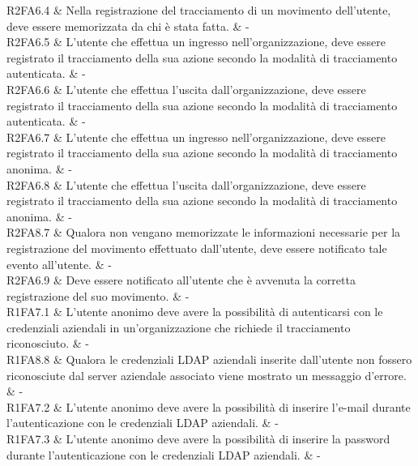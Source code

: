 R2FA6.4 & Nella registrazione del tracciamento di un movimento dell’utente, deve essere memorizzata da chi è stata fatta.  & - \\

R2FA6.5 & L’utente che effettua un ingresso nell’organizzazione, deve essere registrato il tracciamento della sua azione secondo la modalità di tracciamento autenticata.  & - \\

R2FA6.6 & L’utente che effettua l’uscita dall’organizzazione, deve essere registrato il tracciamento della sua azione secondo la modalità di tracciamento autenticata.  & - \\

R2FA6.7 & L’utente che effettua un ingresso nell’organizzazione, deve essere registrato il tracciamento della sua azione secondo la modalità di tracciamento anonima.  & - \\

R2FA6.8 & L’utente che effettua l’uscita dall’organizzazione, deve essere registrato il tracciamento della sua azione secondo la modalità di tracciamento anonima.  & - \\

R2FA8.7 & Qualora non vengano memorizzate le informazioni necessarie per la registrazione del movimento effettuato dall’utente, deve essere notificato tale evento all’utente.  & - \\

R2FA6.9 & Deve essere notificato all’utente che è avvenuta la corretta registrazione del suo movimento.  & - \\


R1FA7.1 & L'utente anonimo deve avere la possibilità di autenticarsi con le credenziali aziendali in un'organizzazione che richiede il tracciamento riconosciuto.  & - \\

R1FA8.8 & Qualora le credenziali LDAP aziendali inserite dall'utente non fossero riconosciute dal server aziendale associato viene mostrato un messaggio d'errore.  & - \\

R1FA7.2 & L'utente anonimo deve avere la possibilità di inserire l'e-mail durante l'autenticazione con le credenziali LDAP aziendali.  & - \\

R1FA7.3 & L'utente anonimo deve avere la possibilità di inserire la password durante l'autenticazione con le credenziali LDAP aziendali.  & - \\

